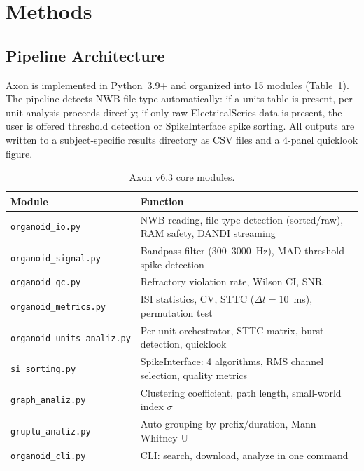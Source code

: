 \documentclass[11pt,a4paper]{article}
\begin{document}
\section{Methods}

\subsection{Pipeline Architecture}

Axon is implemented in Python~3.9+ and organized into 15 modules 
(Table~\ref{tab:modules}). The pipeline detects NWB file type automatically: if a 
units table is present, per-unit analysis proceeds directly; if only raw 
ElectricalSeries data is present, the user is offered threshold detection or 
SpikeInterface spike sorting. All outputs are written to a subject-specific results 
directory as CSV files and a 4-panel quicklook figure.

\begin{table}[h]
\centering
\caption{Axon v6.3 core modules.}
\label{tab:modules}
\small
\begin{tabular}{p{3.8cm} p{10.5cm}}
\toprule
\textbf{Module} & \textbf{Function} \\
\midrule
\texttt{organoid\_io.py} & NWB reading, file type detection (sorted/raw), 
RAM safety, DANDI streaming \\
\texttt{organoid\_signal.py} & Bandpass filter (300--3000~Hz), MAD-threshold 
spike detection \\
\texttt{organoid\_qc.py} & Refractory violation rate, Wilson CI, SNR \\
\texttt{organoid\_metrics.py} & ISI statistics, CV, STTC ($\Delta t = 10$~ms), 
permutation test \\
\texttt{organoid\_units\_analiz.py} & Per-unit orchestrator, STTC matrix, 
burst detection, quicklook \\
\texttt{si\_sorting.py} & SpikeInterface: 4 algorithms, RMS channel 
selection, quality metrics \\
\texttt{graph\_analiz.py} & Clustering coefficient, path length, 
small-world index $\sigma$ \\
\texttt{gruplu\_analiz.py} & Auto-grouping by prefix/duration, Mann--Whitney U \\
\texttt{organoid\_cli.py} & CLI: search, download, analyze in one command \\
\bottomrule
\end{tabular}
\end{table}
\end{document}
